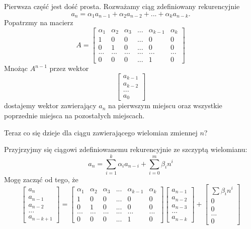 \documentclass{article}
\begin{document}
Pierwsza część jest dość prosta. Rozważamy ciąg zdefiniowany rekurencyjnie
$$a_n=\alpha_1a_{n-1}+\alpha_2a_{n-2}+...+\alpha_ka_{n-k}.$$
Popatrzmy na macierz
$$A=\begin{bmatrix}
    \alpha_1 & \alpha_2 & \alpha_3 & ... &\alpha_{k-1} & \alpha_k\\
    1 & 0 & 0 & ... & 0 & 0\\
    0 & 1 & 0 & ... & 0 & 0\\
    ... & ... & ... & ... & ... & ...\\
    0 & 0 & 0 & ... & 1 & 0
\end{bmatrix}$$
Mnożąc $A^{n-1}$ przez wektor
$$\begin{bmatrix}
    a_{k-1}\\
    a_{k-2}\\
    ...\\
    a_0
\end{bmatrix}$$
dostajemy wektor zawierający $a_n$ na pierwszym miejscu oraz wszystkie poprzednie miejsca na pozostałych miejscach.
\smallskip

Teraz co się dzieje dla ciągu zawierającego wielomian zmiennej $n$?

Przyjrzyjmy się ciągowi zdefiniowanemu rekurencyjnie ze szczyptą wielomianu:
$$a_n=\sum\limits_{i=1}^k\alpha_ia_{n-i}+\sum\limits_{i=0}^m\beta_in^i$$
Mogę zacząć od tego, że
$$\begin{bmatrix}
    a_n\\a_{n-1}\\a_{n-2}\\...\\a_{n-k+1}
\end{bmatrix}=\begin{bmatrix}
    \alpha_1 & \alpha_2 & \alpha_3 & ... &\alpha_{k-1} & \alpha_k\\
    1 & 0 & 0 & ... & 0 & 0\\
    0 & 1 & 0 & ... & 0 & 0\\
    ... & ... & ... & ... & ... & ...\\
    0 & 0 & 0 & ... & 1 & 0
\end{bmatrix}\begin{bmatrix}
    a_{n-1}\\a_{n-2}\\a_{n-3}\\...\\a_{n-k}
\end{bmatrix}+\begin{bmatrix}
    \sum\beta_in^i\\0\\0\\...\\0
\end{bmatrix}$$
\end{document}
